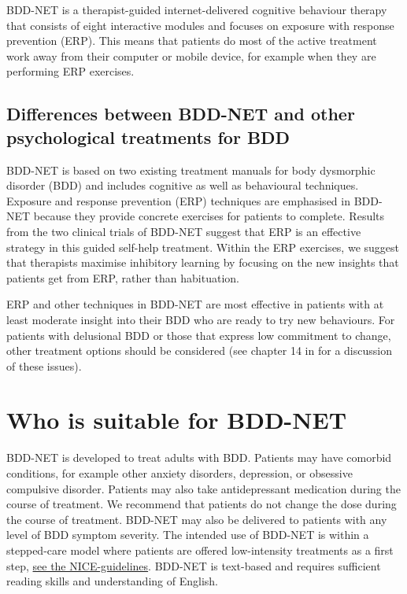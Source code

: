 \documentclass[]{book}
\theoremstyle{definition}
\theoremstyle{definition}
\theoremstyle{definition}
\theoremstyle{remark}
\begin{document}
BDD-NET is a therapist-guided internet-delivered cognitive behaviour
therapy that consists of eight interactive modules and focuses on
exposure with response prevention (ERP). This means that patients do
most of the active treatment work away from their computer or mobile
device, for example when they are performing ERP exercises.

\hypertarget{differences-between-bdd-net-and-other-psychological-treatments-for-bdd}{%
\subsection{Differences between BDD-NET and other psychological
treatments for
BDD}\label{differences-between-bdd-net-and-other-psychological-treatments-for-bdd}}

BDD-NET is based on two existing treatment manuals for body dysmorphic
disorder (BDD) \citep{veale2010, wilhelm2013} and includes cognitive as
well as behavioural techniques. Exposure and response prevention (ERP)
techniques are emphasised in BDD-NET because they provide concrete
exercises for patients to complete. Results from the two clinical trials
of BDD-NET \citep{enander2014, enander2016} suggest that ERP is an
effective strategy in this guided self-help treatment. Within the ERP
exercises, we suggest that therapists maximise inhibitory learning
\citep{craske2014} by focusing on the new insights that patients get
from ERP, rather than habituation.

ERP and other techniques in BDD-NET are most effective in patients with
at least moderate insight into their BDD who are ready to try new
behaviours. For patients with delusional BDD or those that express low
commitment to change, other treatment options should be considered (see
chapter 14 in \citet{veale2010} for a discussion of these issues).

\hypertarget{who-is-suitable-for-bdd-net}{%
\section{Who is suitable for
BDD-NET}\label{who-is-suitable-for-bdd-net}}

BDD-NET is developed to treat adults with BDD. Patients may have
comorbid conditions, for example other anxiety disorders, depression, or
obsessive compulsive disorder. Patients may also take antidepressant
medication during the course of treatment. We recommend that patients do
not change the dose during the course of treatment. BDD-NET may also be
delivered to patients with any level of BDD symptom severity. The
intended use of BDD-NET is within a stepped-care model where patients
are offered low-intensity treatments as a first step,
\href{https://www.nice.org.uk/guidance/CG31/chapter/1-Guidance\#stepped-care-for-adults-young-people-and-children-with-ocd-or-bdd}{see
the NICE-guidelines}. BDD-NET is text-based and requires sufficient
reading skills and understanding of English.
\end{document}
